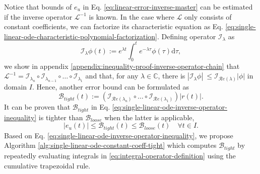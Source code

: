 \documentclass[accepted]{uai2023}
\newcommand{\Err}{e}
\newcommand{\Bound}{\mathcal{B}}
\renewcommand{\L}{\mathcal{L}}
\newcommand{\I}{\mathcal{I}}
\renewcommand{\Re}[1]{\mathcal{R}e\left(#1\right)}
\begin{document}
    Notice that bounds of $\Err_u$ in Eq. \ref{eq:linear-error-inverse-master} can be estimated if the inverse operator $\L^{-1}$ is known. 
    In the case where $\L$ only consists of constant coefficients, we can factorize its characteristic equation as Eq. \ref{eq:single-linear-ode-characteristic-polynomial-factorization}.
    Defining operator $\I_{\lambda}$ as 
    \begin{equation} \label{eq:integral-operator-definition}
        \I_\lambda \phi(t) := e^{{\lambda} t} \int_{0}^{t} e^{-{\lambda} \tau} \phi(\tau) \mathrm{d}\tau,
    \end{equation}
    we show in appendix \ref{appendix:inequality-proof-inverse-operator-chain} that $\L^{-1} = \I_{\lambda_{n}} \circ \I_{\lambda_{n-1}} \circ \dots \circ \I_{\lambda_1}$ and that, for any $\lambda \in \mathbb{C}$, there is $\left|\I_{\lambda} \phi\right| \ \leq \I_{\Re{\lambda}} |\phi|$ in domain $I$.
    Hence, another error bound can be formulated as
    \begin{equation} \label{eq:single-linear-ode-inverse-operator-inequality}
        \Bound_{tight}(t) := \left(\I_{\Re{\lambda_{n}}} \circ \dots \circ \I_{\Re{\lambda_1}}\right) |r(t)|.
    \end{equation}
    It can be proven that $\Bound_{tight}$ in Eq. \ref{eq:single-linear-ode-inverse-operator-inequality} is tighter than $\Bound_{loose}$ when the latter is applicable,
    \begin{equation}
        \left|\Err_u(t)\right| \leq \Bound_{tight}(t) \leq \Bound_{loose}(t) \quad \forall t \in I.
    \end{equation}
    Based on Eq. \ref{eq:single-linear-ode-inverse-operator-inequality}, we propose Algorithm \ref{alg:single-linear-ode-constant-coeff-tight} which computes $\Bound_{tight}$ by repeatedly evaluating integrals in \ref{eq:integral-operator-definition} using the cumulative trapezoidal rule.
\end{document}
